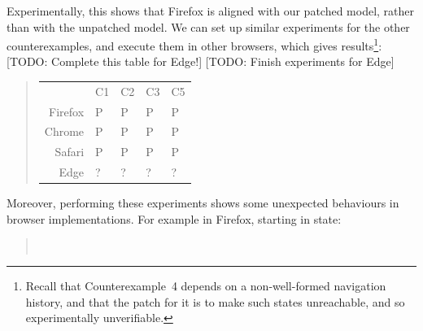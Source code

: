 \documentclass{notes}
\begin{document}
Experimentally, this shows that Firefox is aligned with our patched model, rather than
with the unpatched model. We can set up similar experiments for the other counterexamples,
and execute them in other browsers, which gives results\footnote{%
  Recall that Counterexample~4 depends on a non-well-formed navigation history,
  and that the patch for it is to make such states unreachable, and so
  experimentally unverifiable.
}:
[TODO: Complete this table for Edge!]
[TODO: Finish experiments for Edge]
\begin{quote}
  \begin{tabular}{rllll}
            & C1 & C2 & C3 & C5 \\
    Firefox & P  & P  & P  & P \\
    Chrome  & P  & P  & P  & P \\
    Safari  & P  & P  & P  & P \\
    Edge    & ?  & ?  & ?  & ?
  \end{tabular}
\end{quote}
Moreover, performing these experiments shows some unexpected behaviours
in browser implementations. For example in Firefox, starting in state:
\begin{quote}
    ~
\end{quote}
\end{document}
